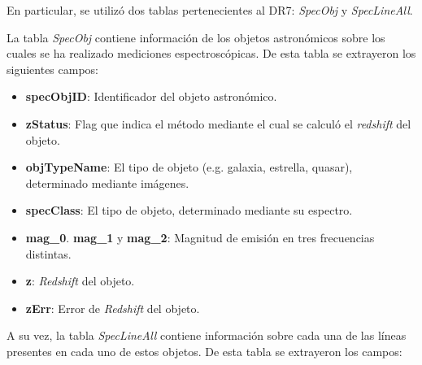 En particular, se utilizó dos tablas pertenecientes al DR7: \textit{SpecObj} y \textit{SpecLineAll}. 

La tabla \textit{SpecObj} contiene información de los objetos astronómicos sobre los cuales se ha realizado mediciones espectroscópicas. De esta tabla se extrayeron los siguientes campos:

\begin{itemize}
\item \textbf{specObjID}: Identificador del objeto astronómico.
\item \textbf{zStatus}: Flag que indica el método mediante el cual se calculó el \textit{redshift} del objeto.
\item \textbf{objTypeName}: El tipo de objeto (e.g. galaxia, estrella, quasar), determinado mediante imágenes.
\item \textbf{specClass}: El tipo de objeto, determinado mediante su espectro.
\item \textbf{mag\_0}. \textbf{mag\_1} y \textbf{mag\_2}: Magnitud de emisión en tres frecuencias distintas.
\item \textbf{z}: \textit{Redshift} del objeto.
\item \textbf{zErr}: Error de \textit{Redshift} del objeto.
\end{itemize}

A su vez, la tabla \textit{SpecLineAll} contiene información sobre cada una de las líneas presentes en cada uno de estos objetos. De esta tabla se extrayeron los campos:

